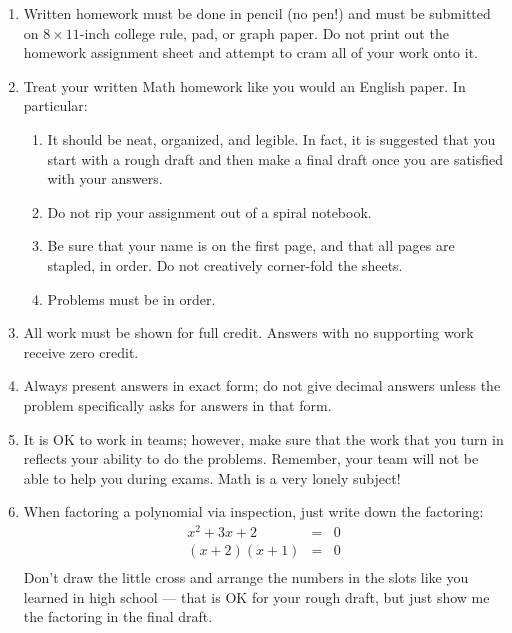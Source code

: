 \documentclass[letterpaper,12pt,fleqn]{article}
\begin{document}

\vspace{0.5in}

\begin{enumerate}
\item Written homework must be done in pencil (no pen!) and must be submitted
  on $8\times11$-inch college rule, pad, or graph paper. Do not print out the
  homework assignment sheet and attempt to cram all of your work onto it.

\item Treat your written Math homework like you would an English paper. In
  particular:
  \begin{enumerate}
  \item It should be neat, organized, and legible. In fact, it is suggested
    that you start with a rough draft and then make a final draft once you
    are satisfied with your answers.

  \item Do not rip your assignment out of a spiral notebook.
    
  \item Be sure that your name is on the first page, and that all pages are
    stapled, in order. Do not creatively corner-fold the sheets.
    
  \item Problems must be in order.
  \end{enumerate}
  
\item All work must be shown for full credit. Answers with no supporting work
  receive zero credit.

\item Always present answers in exact form; do not give decimal answers unless
  the problem specifically asks for answers in that form.

\item It is OK to work in teams; however, make sure that the work that you turn
  in reflects your ability to do the problems. Remember, your team will not
  be able to help you during exams. Math is a very lonely subject!

\item When factoring a polynomial via inspection, just write down the factoring:
\begin{eqnarray*}
x^2+3x+2 &=& 0 \\
(x+2)(x+1) &=& 0 \\
\end{eqnarray*}
Don't draw the little cross and arrange the numbers in the slots like you
learned in high school --- that is OK for your rough draft, but just show me
the factoring in the final draft.


\end{enumerate}
\end{document}
